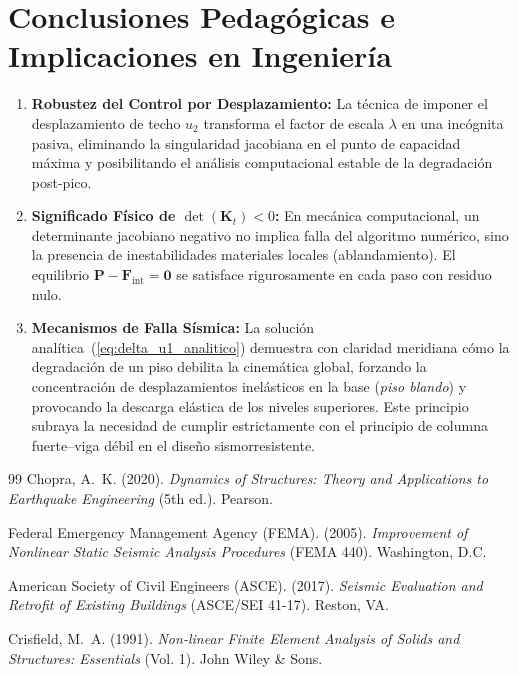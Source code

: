\documentclass[11pt,letterpaper]{article}
\begin{document}
\section{Conclusiones Pedagógicas e Implicaciones en Ingeniería}

\begin{enumerate}
    \item \textbf{Robustez del Control por Desplazamiento:} La técnica de imponer el desplazamiento de techo $u_2$ transforma el factor de escala $\lambda$ en una incógnita pasiva, eliminando la singularidad jacobiana en el punto de capacidad máxima y posibilitando el análisis computacional estable de la degradación post-pico.
    
    \item \textbf{Significado Físico de $\det(\mathbf{K}_t) < 0$:} En mecánica computacional, un determinante jacobiano negativo no implica falla del algoritmo numérico, sino la presencia de inestabilidades materiales locales (ablandamiento). El equilibrio $\mathbf{P} - \mathbf{F}_{\text{int}} = \mathbf{0}$ se satisface rigurosamente en cada paso con residuo nulo.
    
    \item \textbf{Mecanismos de Falla Sísmica:} La solución analítica~(\ref{eq:delta_u1_analitico}) demuestra con claridad meridiana cómo la degradación de un piso debilita la cinemática global, forzando la concentración de desplazamientos inelásticos en la base (\textit{piso blando}) y provocando la descarga elástica de los niveles superiores. Este principio subraya la necesidad de cumplir estrictamente con el principio de columna fuerte--viga débil en el diseño sismorresistente.
\end{enumerate}

\begin{thebibliography}{99}
Chopra, A.~K. (2020). \textit{Dynamics of Structures: Theory and Applications to Earthquake Engineering} (5th ed.). Pearson.

Federal Emergency Management Agency (FEMA). (2005). \textit{Improvement of Nonlinear Static Seismic Analysis Procedures} (FEMA 440). Washington, D.C.

American Society of Civil Engineers (ASCE). (2017). \textit{Seismic Evaluation and Retrofit of Existing Buildings} (ASCE/SEI 41-17). Reston, VA.

Crisfield, M.~A. (1991). \textit{Non-linear Finite Element Analysis of Solids and Structures: Essentials} (Vol. 1). John Wiley \& Sons.
\end{thebibliography}
\end{document}
